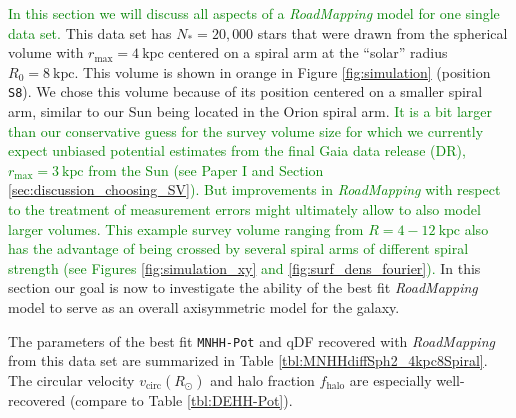\documentclass[iop,revtex4,numberedappendix,appendixfloats]{emulateapj}
\newcommand{\RM}{{\sl RoadMapping}}
\newcommand{\NEW}[1]{\textcolor{Green}{#1}}
\newcommand{\OLD}[1]{}
\begin{document}
\NEW{In this section we will discuss all aspects of a \RM{} model for one single data set.}\OLD{We will focus in this section on one single data set for which we discuss all the different aspects of a \RM{} model.} This data set has $N_*=20,000$ stars that were drawn from the spherical volume with $r_\text{max}=4~\text{kpc}$ centered on a spiral arm at the ``solar'' radius $R_0=8~\text{kpc}$. This volume is shown in orange in Figure \ref{fig:simulation} (position \texttt{S8}). We chose this volume because of its position centered on a smaller spiral arm, similar to our Sun being located in the Orion spiral arm. \NEW{It is a bit larger than our conservative guess for the survey volume size for which we currently expect unbiased potential estimates from the final Gaia data release (DR), $r_\text{max}=3~\text{kpc}$ from the Sun (see Paper I and Section \ref{sec:discussion_choosing_SV}). But improvements in \RM{} with respect to the treatment of measurement errors might ultimately allow to also model larger volumes. This example survey volume ranging from $R=4-12~\text{kpc}$ also has the advantage of being crossed by several spiral arms of different spiral strength (see Figures \ref{fig:simulation_xy} and \ref{fig:surf_dens_fourier}).}\OLD{Our conservative guess for the survey volume size for which we will expect unbiased potential estimates from the final Gaia data release (DR) and with \RM{} in its current form is $r_\text{max}=3~\text{kpc}$ (see Paper I and Section \ref{sec:discussion_choosing_SV}). The slightly larger volume with $r_\text{max}=4~\text{kpc}$ in this section is crossed by several spiral arms and therefore demonstrates \RM{}'s ability to average over spiral arms very well. In addition, we are optimistic that improvements in \RM{}'s treatment of measurement uncertainties that will be made until the final Gaia DR, will ultimately allow the modeling of regions as large as $r_\text{max}=4~\text{kpc}$.} In this section our goal is now to investigate the ability of the best fit \RM{} model \OLD{derived from this survey volume }to serve as an overall axisymmetric model for the galaxy.

The parameters of the best fit \texttt{MNHH-Pot} and qDF recovered with \RM{} from this data set are summarized in Table \ref{tbl:MNHHdiffSph2_4kpc8Spiral}. The circular velocity $v_\text{circ}(R_\odot)$ and halo fraction $f_\text{halo}$ are especially well-recovered (compare to Table \ref{tbl:DEHH-Pot}).
\end{document}
